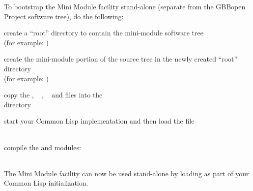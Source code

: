 \documentclass[10pt,twoside,english,pdftex]{article}
\begin{document}
To bootstrap the Mini Module facility stand-alone (separate from the GBBopen
Project software tree), do the following:
\begin{tightitemize}
\item create a ``root'' directory to contain the mini-module software tree\\
  (for example: )
\item create the mini-module portion of the source tree in the newly created
  ``root'' directory\\
  (for example: )
\item copy the
  ,
  \W~
  ,
  \W~
  and
  files into the\\
   directory
\item start your Common Lisp implementation and then load the
   file\\
~~~
\item compile the  and  modules:\\
~~~
\end{tightitemize}
%
The Mini Module facility can now be used stand-alone by loading
 as part of your Common Lisp
initialization.

\W\entities
\T\clearpage
\T\renewcommand{\headrulewidth}{0.01pt}

\end{document}
